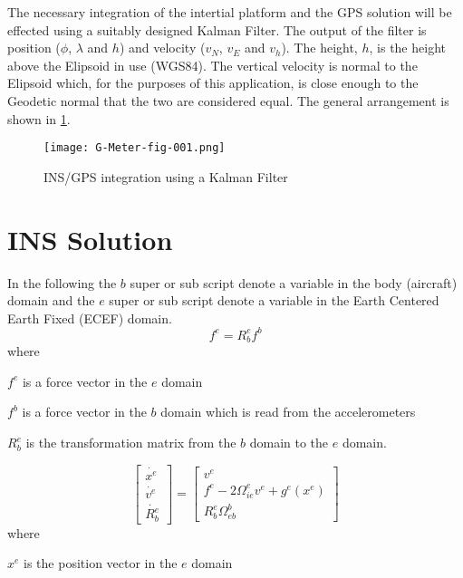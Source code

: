 \documentclass[a4paper]{report}
\numberwithin{equation}{chapter}
\begin{document}
\bigskip

The necessary integration of the intertial platform and the GPS solution will be effected using a suitably designed Kalman Filter. The output of the filter is position ($\phi$, $\lambda$ and $h$) and velocity ($v_N$, $v_E$ and $v_h$). The height, $h$, is the height above the Elipsoid in use (WGS84). The vertical velocity is normal to the Elipsoid which, for the purposes of this application, is close enough to the Geodetic normal that the two are considered equal. The general arrangement is shown in \ref{fig:001}.
\begin{figure}
\centering 
\texttt{[image: G-Meter-fig-001.png]}
\caption[INS/GPS integration using a Kalman Filter]{INS/GPS integration using a Kalman Filter}
\label{fig:001}
\end{figure}

\section[INS Solution]{INS Solution}

In the following the $b$ super or sub script denote a variable in the body (aircraft) domain and the $e$ super or sub script denote a variable in the Earth Centered Earth Fixed (ECEF) domain.
\begin{equation}
f^e = R^e_b f^b
\label{eqn:BodytoECEFForce}
\end{equation}
where

  $f^e$ is a force vector in the $e$ domain

  $f^b$ is a force vector in the $b$ domain which is read from the accelerometers

  $R^e_b$ is the transformation matrix from the $b$ domain to the $e$ domain.

\begin{equation}
\begin{bmatrix}
\dot{x^e}\\
\dot{v^e}\\
\dot{R^e_b}
\end{bmatrix}
=
\begin{bmatrix}
v^e\\
f^e - 2\Omega^e_{ie} v^e + g^e \left( x^e \right)\\
R^e_b \Omega^b_{eb}
\end{bmatrix}
\label{eqn:dynamic}
\end{equation}
where

  $x^e$ is the position vector in the $e$ domain
\end{document}
